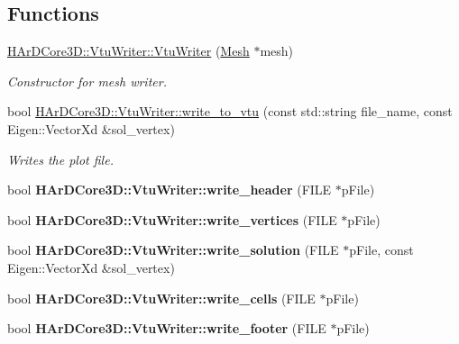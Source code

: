 \subsection*{Functions}
\begin{DoxyCompactItemize}
\item 
\hyperlink{group__Plot_ga7aff33c21507345fcaa46515ed006470}{H\+Ar\+D\+Core3\+D\+::\+Vtu\+Writer\+::\+Vtu\+Writer} (\hyperlink{classHArDCore3D_1_1Mesh}{Mesh} $\ast$mesh)
\begin{DoxyCompactList}\small\item\em Constructor for mesh writer. \end{DoxyCompactList}\item 
bool \hyperlink{group__Plot_ga11ec3bf54886e6570bfe72daf3f41a5d}{H\+Ar\+D\+Core3\+D\+::\+Vtu\+Writer\+::write\+\_\+to\+\_\+vtu} (const std\+::string file\+\_\+name, const Eigen\+::\+Vector\+Xd \&sol\+\_\+vertex)
\begin{DoxyCompactList}\small\item\em Writes the plot file. \end{DoxyCompactList}\item 
\mbox{\label{group__Plot_gad00c86f7a2545735f3cb5ed42f25484e}} 
bool {\bfseries H\+Ar\+D\+Core3\+D\+::\+Vtu\+Writer\+::write\+\_\+header} (F\+I\+LE $\ast$p\+File)
\item 
\mbox{\label{group__Plot_gac7516782654b2377ec6930806c5d353a}} 
bool {\bfseries H\+Ar\+D\+Core3\+D\+::\+Vtu\+Writer\+::write\+\_\+vertices} (F\+I\+LE $\ast$p\+File)
\item 
\mbox{\label{group__Plot_ga67e074b8c269a0bb476252931ebdbeae}} 
bool {\bfseries H\+Ar\+D\+Core3\+D\+::\+Vtu\+Writer\+::write\+\_\+solution} (F\+I\+LE $\ast$p\+File, const Eigen\+::\+Vector\+Xd \&sol\+\_\+vertex)
\item 
\mbox{\label{group__Plot_ga4d46a3ca45da37492e5cabda737f7399}} 
bool {\bfseries H\+Ar\+D\+Core3\+D\+::\+Vtu\+Writer\+::write\+\_\+cells} (F\+I\+LE $\ast$p\+File)
\item 
\mbox{\label{group__Plot_ga2da6c9e874bb9094ddb44b3ff6a4a6a8}} 
bool {\bfseries H\+Ar\+D\+Core3\+D\+::\+Vtu\+Writer\+::write\+\_\+footer} (F\+I\+LE $\ast$p\+File)
\end{DoxyCompactItemize}


